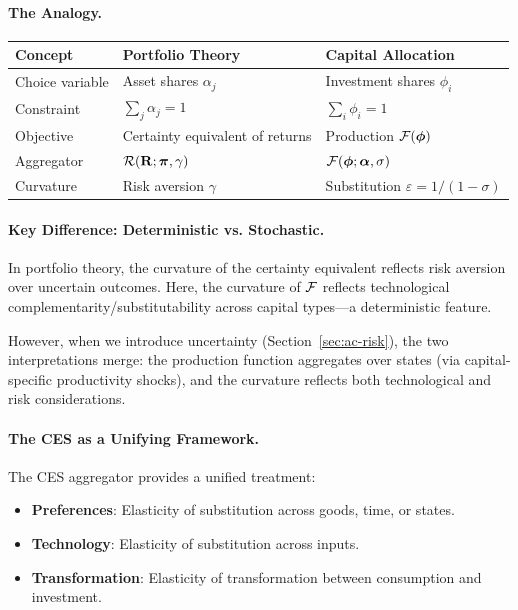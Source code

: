 \paragraph{The Analogy.}
\begin{center}
\begin{tabular}{@{}lll@{}}
\toprule
\textbf{Concept} & \textbf{Portfolio Theory} & \textbf{Capital Allocation} \\
\midrule
Choice variable & Asset shares $\alpha_j$ & Investment shares $\phi_i$ \\
Constraint & $\sum_j \alpha_j = 1$ & $\sum_i \phi_i = 1$ \\
Objective & Certainty equivalent of returns & Production $\mathcal{F}(\boldsymbol{\phi})$ \\
Aggregator & $\mathcal{R}(\mathbf{R}; \boldsymbol{\pi}, \gamma)$ & $\mathcal{F}(\boldsymbol{\phi}; \boldsymbol{\alpha}, \sigma)$ \\
Curvature & Risk aversion $\gamma$ & Substitution $\varepsilon = 1/(1-\sigma)$ \\
\bottomrule
\end{tabular}
\end{center}

\paragraph{Key Difference: Deterministic vs. Stochastic.}
In portfolio theory, the curvature of the certainty equivalent reflects risk aversion over uncertain outcomes. Here, the curvature of $\mathcal{F}$ reflects technological complementarity/substitutability across capital types---a deterministic feature.

However, when we introduce uncertainty (Section~\ref{sec:ac-risk}), the two interpretations merge: the production function aggregates over states (via capital-specific productivity shocks), and the curvature reflects both technological and risk considerations.

\paragraph{The CES as a Unifying Framework.}
The CES aggregator provides a unified treatment:
\begin{itemize}[nosep]
\item \textbf{Preferences}: Elasticity of substitution across goods, time, or states.
\item \textbf{Technology}: Elasticity of substitution across inputs.
\item \textbf{Transformation}: Elasticity of transformation between consumption and investment.
\end{itemize}

